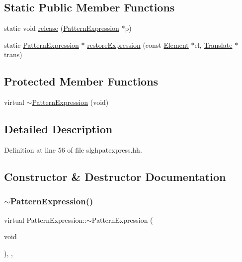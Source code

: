 \subsection*{Static Public Member Functions}
\begin{DoxyCompactItemize}
\item 
static void \mbox{\hyperlink{class_pattern_expression_a3528f68b2f3f8ff6a12a8650a949203c}{release}} (\mbox{\hyperlink{class_pattern_expression}{Pattern\+Expression}} $\ast$p)
\item 
static \mbox{\hyperlink{class_pattern_expression}{Pattern\+Expression}} $\ast$ \mbox{\hyperlink{class_pattern_expression_a77a394eabbb5d76013c19e7bc3455ea5}{restore\+Expression}} (const \mbox{\hyperlink{class_element}{Element}} $\ast$el, \mbox{\hyperlink{class_translate}{Translate}} $\ast$trans)
\end{DoxyCompactItemize}
\subsection*{Protected Member Functions}
\begin{DoxyCompactItemize}
\item 
virtual \mbox{\hyperlink{class_pattern_expression_aa9cf2cdcba25febbeca5821efddb565c}{$\sim$\+Pattern\+Expression}} (void)
\end{DoxyCompactItemize}


\subsection{Detailed Description}


Definition at line 56 of file slghpatexpress.\+hh.



\subsection{Constructor \& Destructor Documentation}
\mbox{\label{class_pattern_expression_aa9cf2cdcba25febbeca5821efddb565c}} 
\subsubsection{\texorpdfstring{$\sim$PatternExpression()}{~PatternExpression()}}
{\footnotesize\ttfamily virtual Pattern\+Expression\+::$\sim$\+Pattern\+Expression (\begin{DoxyParamCaption}\item[{void}]{ }\end{DoxyParamCaption})\hspace{0.3cm}{\ttfamily [inline]}, {\ttfamily [protected]}, {\ttfamily [virtual]}}



